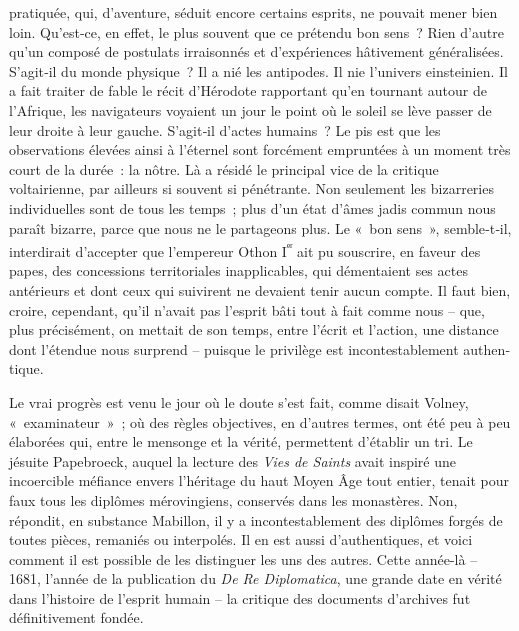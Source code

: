 \documentclass[french,twoside]{book} %
\newcommand{\astermono}{\medskip\centerline{\color{rubric}\large\selectfont{\syms ✻}}\medskip\par}%
\begin{document}
\label{p36} pratiquée, qui, d’aventure, séduit encore certains esprits, ne pouvait mener bien loin. Qu’est‑ce, en effet, le plus souvent que ce prétendu bon sens ? Rien d’autre qu’un composé de postulats irraisonnés et d’expé­riences hâtivement généralisées. S’agit‑il du monde physique ? Il a nié les antipodes. Il nie l’univers einsteinien. Il a fait traiter de fable le récit d’Hérodote rapportant qu’en tournant autour de l’Afrique, les naviga­teurs voyaient un jour le point où le soleil se lève passer de leur droite à leur gauche. S’agit‑il d’actes humains ? Le pis est que les observations élevées ainsi à l’éternel sont forcément empruntées à un moment très court de la durée : la nôtre. Là a résidé le principal vice de la critique voltairienne, par ailleurs si souvent si pénétrante. Non seulement les bizarreries individuelles sont de tous les temps ; plus d’un état d’âmes jadis commun nous paraît bizarre, parce que nous ne le partageons plus. Le « bon sens », semble‑t‑il, interdirait d’accepter que l’empereur Othon I\textsuperscript{ᵉʳ} ait pu souscrire, en faveur des papes, des concessions territoriales inap­plicables, qui démentaient ses actes antérieurs et dont ceux qui suivirent ne devaient tenir aucun compte. Il faut bien, croire, cependant, qu’il n’avait pas l’esprit bâti tout à fait comme nous – que, plus précisément, on mettait de son temps, entre l’écrit et l’action, une distance dont l’éten­due nous surprend – puisque le privilège est incontestablement authen­tique.\par
Le vrai progrès est venu le jour où le doute s’est fait, comme disait Volney, « examinateur » ; où des règles objectives, en d’autres termes, ont été peu à peu élaborées qui, entre le mensonge et la vérité, permettent d’établir un tri. Le jésuite Papebroeck, auquel la lecture des \emph{Vies de Saints} avait inspiré une incoercible méfiance envers l’héritage du haut Moyen Âge tout entier, tenait pour faux tous les diplômes mérovingiens, conservés dans les monastères. Non, répondit, en substance Mabillon, il y a incontestablement des diplômes forgés de toutes pièces, remaniés ou interpolés. Il en est aussi d’authentiques, et voici comment il est possible de les distinguer les uns des autres. Cette année-là – 1681, l’année de la publication du \emph{De Re Diplomatica}, une grande date en vérité dans l’histoire de l’esprit humain – la critique des documents d’archives fut définitivement fondée.\par

\astermono
\end{document}
